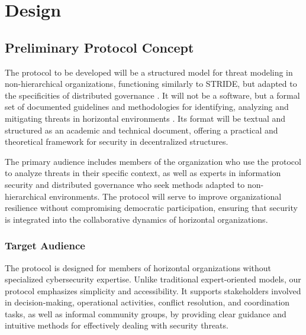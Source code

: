 
%

\chapter{Design}
\label{cha:design}

\glsresetall
 
\section{Preliminary Protocol Concept}
\label{sec:preliminary_protocol_concept}

The protocol to be developed will be a structured model for threat modeling in
non-hierarchical organizations, functioning similarly to STRIDE, but adapted to
the specificities of distributed governance
\cite{ThreatModelingdesigningForSecurity}. It will not be a software, but a
formal set of documented guidelines and methodologies for identifying, analyzing
and mitigating threats in horizontal environments \cite{Colbac}. Its format will
be textual and structured as an academic and technical document, offering a
practical and theoretical framework for security in decentralized structures.

The primary audience includes members of the organization who use the protocol
to analyze threats in their specific context, as well as experts in information
security and distributed governance who seek methods adapted to non-hierarchical
environments. The protocol will serve to improve organizational resilience
without compromising democratic participation, ensuring that security is
integrated into the collaborative dynamics of horizontal organizations.

\subsection{Target Audience}
\label{subsec:target_audience}

The protocol is designed for members of horizontal organizations without
specialized cybersecurity expertise. Unlike traditional expert-oriented models,
our protocol emphasizes simplicity and accessibility. It supports stakeholders
involved in decision-making, operational activities, conflict resolution, and
coordination tasks, as well as informal community groups, by providing clear
guidance and intuitive methods for effectively dealing with security threats.


